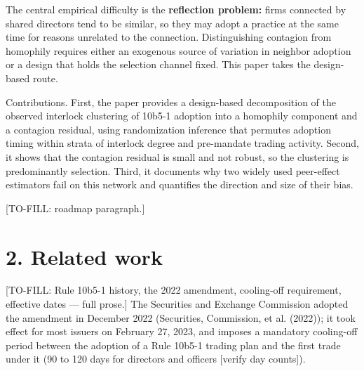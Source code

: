 \documentclass[
  a4paper,
]{article}
\begin{document}
The central empirical difficulty is the \textbf{reflection problem:}
firms connected by shared directors tend to be similar, so they may
adopt a practice at the same time for reasons unrelated to the
connection. Distinguishing contagion from homophily requires either an
exogenous source of variation in neighbor adoption or a design that
holds the selection channel fixed. This paper takes the design-based
route.

Contributions. First, the paper provides a design-based decomposition of
the observed interlock clustering of 10b5-1 adoption into a homophily
component and a contagion residual, using randomization inference that
permutes adoption timing within strata of interlock degree and
pre-mandate trading activity. Second, it shows that the contagion
residual is small and not robust, so the clustering is predominantly
selection. Third, it documents why two widely used peer-effect
estimators fail on this network and quantifies the direction and size of
their bias.

{[}TO-FILL: roadmap paragraph.{]}

\section{2. Related work}\label{related-work}

{[}TO-FILL: Rule 10b5-1 history, the 2022 amendment, cooling-off
requirement, effective dates --- full prose.{]} The Securities and
Exchange Commission adopted the amendment in December 2022 (Securities,
Commission, et al. (2022)); it took effect for most issuers on February
27, 2023, and imposes a mandatory cooling-off period between the
adoption of a Rule 10b5-1 trading plan and the first trade under it (90
to 120 days for directors and officers {[}verify day counts{]}).
\end{document}
